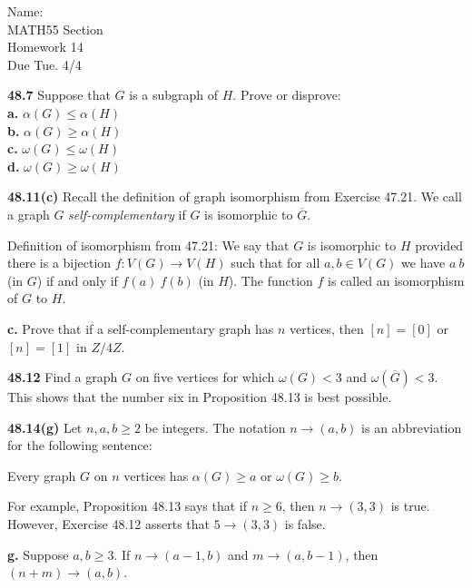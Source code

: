 \documentclass[10pt]{article}
\begin{document}
\begin{flushright}
	Name: \underline{\hspace{3cm}} \\
	MATH55 Section \underline{\hspace{0.5cm}} \\
	Homework 14 \\
	Due Tue. 4/4
\end{flushright}


\begin{framed}
	\textbf{48.7} Suppose that $G$ is a subgraph of $H$. Prove or disprove:\\
	\indent \textbf{a.} $\alpha(G) \leq \alpha(H)$\\
	\indent \textbf{b.} $\alpha(G) \geq \alpha(H)$\\
	\indent \textbf{c.} $\omega(G) \leq \omega(H)$\\
	\indent \textbf{d.} $\omega(G) \geq \omega(H)$
\end{framed}

\pagebreak

\begin{framed}
	\textbf{48.11(c)} Recall the definition of graph isomorphism from Exercise 47.21. 
	We call a graph $G$ \textit{self-complementary} if $G$ is isomorphic to $\overline{G}$.

	Definition of isomorphism from 47.21: 
	We say that $G$ is isomorphic to $H$ provided there is a bijection $f: V(G) \rightarrow V(H)$ 
	such that for all $a, b \in V(G)$ we have $a ~ b$ (in $G$) if and only if $f(a) ~ f(b)$ (in $H$). 
	The function $f$ is called an isomorphism of $G$ to $H$.

	\textbf{c.} Prove that if a self-complementary graph has $n$ vertices, then $[n] = [0]$ or $[n] = [1]$
	in $Z/4Z$.
\end{framed}

\pagebreak

\begin{framed}
	\textbf{48.12} Find a graph $G$ on five vertices for which $\omega(G) < 3$ and $\omega(\overline{G}) < 3$. 
	This shows that the number six in Proposition 48.13 is best possible.
\end{framed}

\pagebreak

\begin{framed}
	\textbf{48.14(g)} Let $n, a, b \geq 2$ be integers. The notation $n \rightarrow (a,b)$ 
	is an abbreviation for the following sentence:

	Every graph $G$ on $n$ vertices has $\alpha(G) \geq a$ or $\omega(G) \geq b$.

	For example, Proposition 48.13 says that if $n \geq 6$, then $n \rightarrow (3,3)$ is true. 
	However, Exercise 48.12 asserts that $5 \rightarrow (3,3)$ is false.

	\textbf{g.} Suppose $a,b \geq 3$.
	If $n \rightarrow (a-1, b)$ and $m \rightarrow (a, b-1)$, then $(n+m) \rightarrow (a,b)$.
\end{framed}
\end{document}

